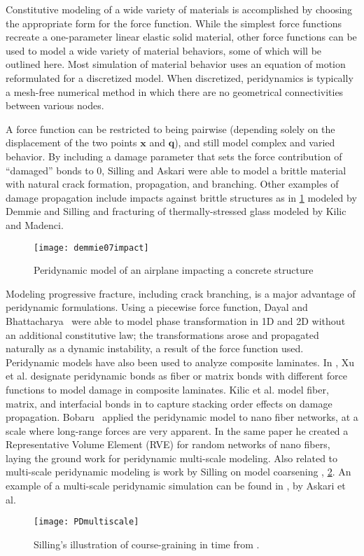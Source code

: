 Constitutive modeling of a wide variety of materials is accomplished by choosing the appropriate form for the force function.
While the simplest force functions recreate a one-parameter linear elastic solid material, other force functions can be used to model a wide variety of material behaviors, some of which will be outlined here.
Most simulation of material behavior uses an equation of motion reformulated for a discretized model.
When discretized, peridynamics is typically a mesh-free numerical method in which there are no geometrical connectivities between various nodes.

A force function can be restricted to being pairwise (depending solely on the displacement of the two points \(\mathbf{x}\) and \(\mathbf{q}\)), and still model complex and varied behavior.
By including a damage parameter that sets the force contribution of ``damaged'' bonds to \(0\), Silling and Askari\cite{silling2005meshfree} were able to model a brittle material with natural crack formation, propagation, and branching.
Other examples of damage propagation include impacts against brittle structures as in \cref{fig:PDimpact} modeled by Demmie and Silling\cite{demmie2007approach} and fracturing of thermally-stressed glass modeled by Kilic and Madenci\cite{kilic2009prediction}. 
%
\begin{figure}[h]
  \centering
\texttt{[image: demmie07impact]}
\caption[Peridynamic model of an airplane impacting a concrete structure]{Peridynamic model of an airplane impacting a concrete structure \cite{demmie2007approach} }
\label{fig:PDimpact}
\end{figure}
%
Modeling progressive fracture, including crack branching, is a major advantage of peridynamic formulations.
Using a piecewise force function, Dayal and Bhattacharya~\cite{dayal2006kinetics} were able to model phase transformation in 1D and 2D without an additional constitutive law; the transformations arose and propagated naturally as a dynamic instability, a result of the force function used.
Peridynamic models have also been used to analyze composite laminates.
In \cite{xu2008peridynamic}, Xu et al. designate peridynamic bonds as fiber or matrix bonds with different force functions to model damage in composite laminates. 
Kilic et al. model fiber, matrix, and interfacial bonds in \cite{kilic2009peridynamic} to capture stacking order effects on damage propagation.
Bobaru~\cite{bobaru2007influence} applied the peridynamic model to nano fiber networks, at a scale where long-range forces are very apparent.
In the same paper he created a Representative Volume Element (RVE) for random networks of nano fibers, laying the ground work for peridynamic multi-scale modeling.
Also related to multi-scale peridynamic modeling is work by Silling on model coarsening \cite{silling2011coarsening}, \cref{fig:PDmultiscale}.
An example of a multi-scale peridynamic simulation can be found in \cite{askari2008peridynamics}, by Askari et al.
%
\begin{figure}[h]
  \centering
\texttt{[image: PDmultiscale]}
\caption[Silling's illustration of course-graining in time]{Silling's illustration of course-graining in time from \cite{silling2011coarsening}.}
\label{fig:PDmultiscale}
\end{figure}
%

